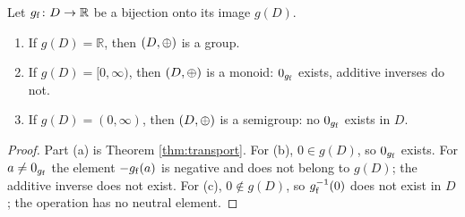 \documentclass[11pt,a4paper]{article}
\begin{document}
\begin{proposition}
\label{prop:classification}
Let $g_{\mathrm{f}}\colon D\to\mathbb{R}$ be a bijection onto its image $g(D)$.
\begin{enumerate}[label=(\alph*),leftmargin=2.2em]
  \item If $g(D)=\mathbb{R}$, then $(D,\mathbin{\oplus})$ is a group.
  \item If $g(D)=[0,\infty)$, then $(D,\mathbin{\oplus})$ is a monoid: $0_{g_{\mathrm{f}}}$ exists,
        additive inverses do not.
  \item If $g(D)=(0,\infty)$, then $(D,\mathbin{\oplus})$ is a semigroup: no $0_{g_{\mathrm{f}}}$
        exists in $D$.
\end{enumerate}
\end{proposition}

\begin{proof}
Part (a) is Theorem \ref{thm:transport}. For (b), $0\in g(D)$, so $0_{g_{\mathrm{f}}}$
exists. For $a\neq0_{g_{\mathrm{f}}}$ the element $-g_{\mathrm{f}}(a)$ is negative and does not belong
to $g(D)$; the additive inverse does not exist. For (c), $0\notin g(D)$, so
$g_{\mathrm{f}}^{-1}(0)$ does not exist in $D$; the operation has no neutral element.
\end{proof}
\end{document}
